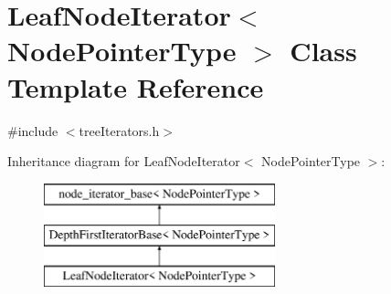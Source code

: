 \hypertarget{classLeafNodeIterator}{}\section{Leaf\+Node\+Iterator$<$ Node\+Pointer\+Type $>$ Class Template Reference}
\label{classLeafNodeIterator}


{\ttfamily \#include $<$tree\+Iterators.\+h$>$}

Inheritance diagram for Leaf\+Node\+Iterator$<$ Node\+Pointer\+Type $>$\+:\begin{figure}[H]
\begin{center}
\leavevmode
\includegraphics[height=3.000000cm]{classLeafNodeIterator}
\end{center}
\end{figure}
